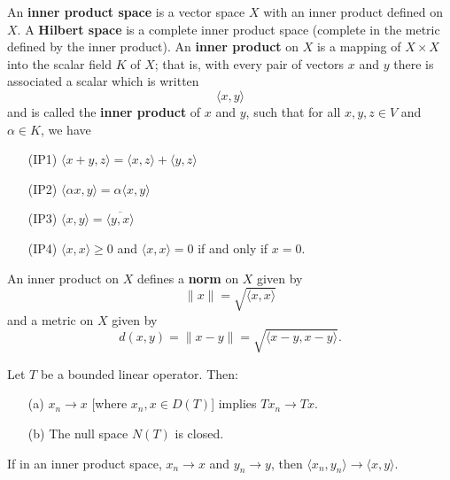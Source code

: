\begin{definition}
   An \textbf{inner product space} is a vector space \( X  \) with an inner product defined on \( X  \). A \textbf{Hilbert space} is a complete inner product space (complete in the metric defined by the inner product). An \textbf{inner product} on \( X  \) is a mapping of \( X \times X  \) into the scalar field \( K  \) of \( X  \); that is, with every pair of vectors \( x  \) and \( y \) there is associated a scalar which is written  
   \[  \langle x , y \rangle \] 
   and is called the \textbf{inner product} of \( x  \) and \( y \), such that for all \( x,y,z \in V  \) and \( \alpha \in K  \), we have
   \begin{enumerate}
       \item[(IP1)] \( \langle x + y  ,  z  \rangle = \langle x  ,  z  \rangle + \langle y  ,  z  \rangle \)
        \item[(IP2)] \( \langle \alpha x  ,  y  \rangle = \alpha \langle x , y \rangle \)
        \item[(IP3)] \( \langle x , y \rangle = \overline{\langle y , x \rangle} \)
        \item[(IP4)] \( \langle x  ,  x  \rangle \geq 0  \) and \( \langle x  ,  x  \rangle = 0   \) if and only if \( x = 0  \). 
   \end{enumerate}
   An inner product on \( X  \) defines a \textbf{norm} on \( X  \) given by 
   \[  \|x \| = \sqrt{ \langle x  , x  \rangle }  \]
   and a metric on \( X  \) given by
   \[  d(x,y) = \|x - y \| = \sqrt{  \langle  x - y  ,  x - y  \rangle }.  \]
\end{definition}


\begin{corollary}\label{2.7-10}
    Let \( T  \) be a bounded linear operator. Then:
    \begin{enumerate}
        \item[(a)] \( {x}_{n} \to x  \) [where \( {x}_{n}, x \in D(T) \)] implies \( T {x}_{n} \to T x  \). 
        \item[(b)] The null space \( N(T) \) is closed.
    \end{enumerate}
\end{corollary}


\begin{lemma}\label{3.2-2}
   If in an inner product space, \( {x}_{n} \to x  \) and \( {y}_{n} \to y  \), then \( \langle {x}_{n}  ,  {y}_{n} \rangle \to \langle x , y \rangle \). 
\end{lemma}

